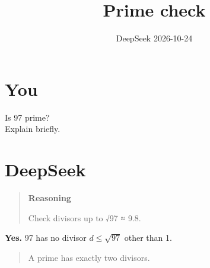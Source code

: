 \documentclass[11pt,a4paper]{article}
\title{Prime check}
\date{DeepSeek \textperiodcentered{} 2026-10-24}
\begin{document}
\maketitle

\section*{You}

Is 97 prime?\\
Explain briefly.


\section*{DeepSeek}

\begin{quote}
\textbf{Reasoning}

Check divisors up to √97 ≈ 9.8.

\end{quote}

\textbf{Yes.} 97 has no divisor $d \le \sqrt{97}$ other than 1.

\begin{quote}
A prime has exactly two divisors.

\end{quote}
\end{document}

